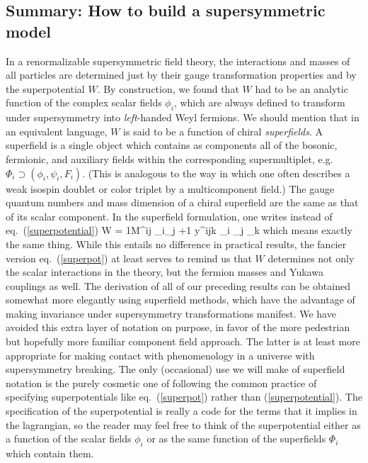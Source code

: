 \subsection{Summary: How to build a supersymmetric
model}\label{subsec:susylagr.summary}

In a renormalizable supersymmetric field theory, the interactions
and masses of all particles are determined just by their gauge
transformation properties and by the superpotential $W$.
By construction, we found that $W$ had to be
an analytic function of the complex scalar fields $\phi_i$, which are
always defined to transform under supersymmetry into {\it left}-handed
Weyl fermions. We should mention that
in an equivalent language, $W$ is said to be a function of chiral
{\it superfields}.\cite{superfields}
A superfield is a single object which contains as
components all of the bosonic, fermionic, and auxiliary fields within
the corresponding supermultiplet, e.g.~$\Phi_i \supset (\phi_i,\psi_i,F_i)$.
(This is analogous to the way in which one often describes a weak
isospin doublet or color triplet by a multicomponent field.)
The gauge
quantum numbers and mass dimension of a chiral superfield are the same as
that of its
scalar component.
In
the superfield formulation, one writes instead of
eq.~(\ref{superpotential})
\beq
W = {1}M^{ij} \Phi_i\Phi_j +{1} y^{ijk} \Phi_i \Phi_j \Phi_k
\label{superpot}
\eeq
which means exactly the same thing. While this entails no difference in
practical results, the fancier version eq.~(\ref{superpot}) at least serves
to remind us that $W$ determines not only the scalar interactions in the
theory, but the fermion masses and Yukawa couplings as well.
The derivation of all of our preceding results can be obtained somewhat
more elegantly using superfield methods, which have the advantage
of making invariance under supersymmetry
transformations manifest. We have avoided this extra layer of notation
on purpose, in favor of the more pedestrian but hopefully more familiar
component field approach. The latter is at least more appropriate for making
contact with phenomenology in a universe with supersymmetry breaking.
The only (occasional) use we will make of superfield notation is the
purely cosmetic one of following
the common practice of specifying superpotentials like
eq.~(\ref{superpot}) rather than (\ref{superpotential}).
The specification of the
superpotential is really a code for the terms that it implies
in the lagrangian, so the reader may feel free to
think of the superpotential either as a function of the scalar fields
$\phi_i$ or as the same function of
the superfields $\Phi_i$ which contain them.

